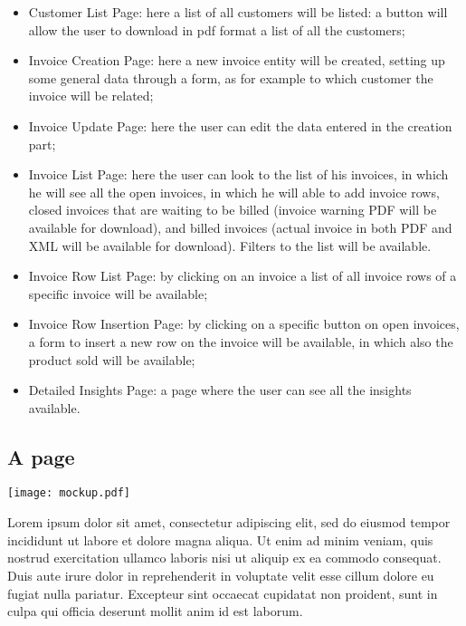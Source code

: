 \begin{itemize}
    \item Customer List Page: here a list of all customers will be listed: a button will allow the user to download in pdf format a list of all the customers;
    \item Invoice Creation Page: here a new invoice entity will be created, setting up some general data through a form, as for example to which customer the invoice will be related;
    \item Invoice Update Page: here the user can edit the data entered in the creation part;
    \item Invoice List Page: here the user can look to the list of his invoices, in which he will see all the open invoices, in which he will able to add invoice rows, closed invoices that are waiting to be billed (invoice warning PDF will be available for download), and billed invoices (actual invoice in both PDF and XML will be available for download). Filters to the list will be available.
    \item Invoice Row List Page: by clicking on an invoice a list of all invoice rows of a specific invoice will be available;
    \item Invoice Row Insertion Page: by clicking on a specific button on open invoices, a form to insert a new row on the invoice will be available, in which also the product sold will be available;
    \item Detailed Insights Page: a page where the user can see all the insights available.
\end{itemize}

\subsection{A page}


\texttt{[image: mockup.pdf]}

Lorem ipsum dolor sit amet, consectetur adipiscing elit, sed do eiusmod tempor incididunt ut labore et dolore magna aliqua. Ut enim ad minim veniam, quis nostrud exercitation ullamco laboris nisi ut aliquip ex ea commodo consequat. Duis aute irure dolor in reprehenderit in voluptate velit esse cillum dolore eu fugiat nulla pariatur. Excepteur sint occaecat cupidatat non proident, sunt in culpa qui officia deserunt mollit anim id est laborum.